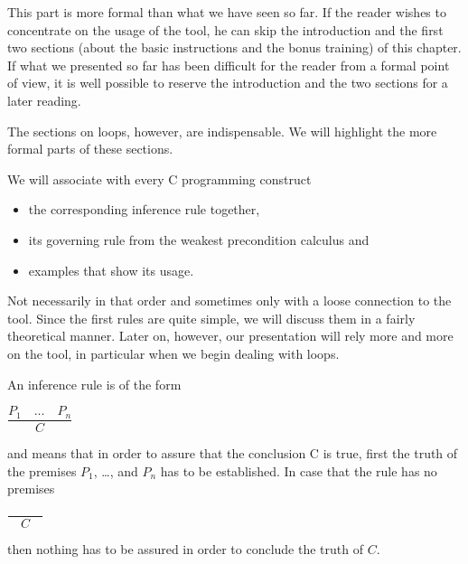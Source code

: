 \begin{Information}
  This part is more formal than what we have seen so far. If the reader
  wishes to concentrate on the usage of the tool, he can skip the
  introduction and the first two sections (about the basic instructions
  and the bonus training) of this chapter. If what we presented so far has
  been difficult for the reader from a formal point of view,
  it is well possible to reserve the introduction and the two
  sections for a later reading.

  The sections on loops, however, are indispensable. We will highlight
  the more formal parts of these sections.
\end{Information}


We will associate with every C programming construct

\begin{itemize}
\item the corresponding inference rule together,
\item its governing rule from the weakest precondition calculus and
\item examples that show its usage.
\end{itemize}

Not necessarily in that order and sometimes only with a loose connection
to the tool. Since the first rules are quite simple, we will discuss
them in a fairly theoretical manner. Later on, however, our presentation
will rely more and more on the tool, in particular when we begin dealing
with loops.





An inference rule is of the form




\begin{center}
$\dfrac{P_1 \quad ... \quad P_n}{C}$


\end{center}


and means that in order to assure that the conclusion C is true, first
the truth of the premises $P_1$, \ldots{}, and $P_n$ has to be
established. In case that the rule has no premises




\begin{center}
$\dfrac{}{\quad C \quad}$


\end{center}


then nothing has to be assured in order to conclude the truth of $C$.

